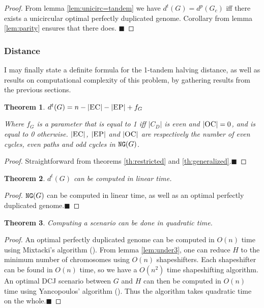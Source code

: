 \documentclass[11pt,final,twoside,nofrench]{thlifl}
\newcommand{\qed}{\ensuremath{\blacksquare}}
\renewcommand{\NG}{\ensuremath{\mbox{\texttt{NG}}}}
\newtheorem{proof}{Proof}
\newtheorem{theorem}{Theorem}
\begin{document}
\begin{proof} 
    From lemma \ref{lem:unicirc=tandem} we have $d^t(G) =
    d^p(G_c)$ iff there exists a unicircular optimal perfectly
    duplicated genome.  Corollary from lemma \ref{lem:parity} ensures
    that there does. \qed
\end{proof}

\subsubsection{Distance}

I may finally state a definite formula for the 1-tandem halving distance, as well as results on computational complexity of this problem, by gathering results from the previous sections.

\begin{theorem}

$d^t(G) = n - |{{\textsc{EC}}}| - |{{\textsc{EP}}}| + f_G$

Where $f_G$ is a parameter that is equal to 1 iff $|C_D|$ is even and $|{{\textsc{OC}}}| = 0$, and is equal to 0 otherwise. $|{{\textsc{EC}}}|$, $|{{\textsc{EP}}}|$ and $|{{\textsc{OC}}}|$ are respectively the number of even cycles, even paths and odd cycles in $\NG(G)$.

\end{theorem}

\begin{proof} 
Straightforward from theorems \ref{th:restricted} and \ref{th:generalized}.\qed 
\end{proof}

\begin{theorem}
 $d^t(G)$ can be computed in linear time.
\end{theorem}
\begin{proof}
$\NG(G)$ can be computed in linear time, as well as an optimal perfectly duplicated genome.\qed
\end{proof}

\begin{theorem}
    Computing a scenario can be done in quadratic time.
\end{theorem}
\begin{proof}
An optimal perfectly duplicated genome can be computed in $O(n)$ time using Mixtacki's algorithm (\cite{Mixtacki08}).
From lemma \ref{lem:under3}, one can reduce $H$ to the minimum number of chromosomes using $O(n)$ shapeshifters. Each shapeshifter can be found in $O(n)$ time, so we have a $O(n^2)$ time shapeshifting algorithm.
An optimal DCJ scenario between $G$ and $H$ can then be computed in $O(n)$ time using Yancopoulos' algorithm (\cite{Yancopoulos05}). Thus the algorithm takes quadratic time on the whole.\qed
\end{proof}
\end{document}
